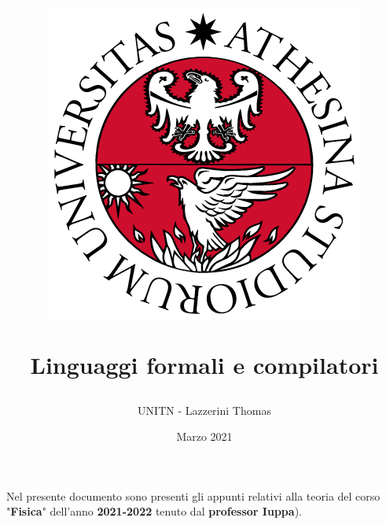 \documentclass[12pt]{article}
\title{
    \begin{figure}[ht!]
        \centering
        \includegraphics[width=.5\textwidth]{LOGO}
        \label{fig:logo unitn}
    \end{figure}
    \bigskip
    Linguaggi formali e compilatori
}
\author{UNITN - Lazzerini Thomas}
\date{Marzo 2021}
\begin{document}
    \maketitle
    \vfill

    \begin{center}
        Nel presente documento sono presenti gli appunti relativi alla teoria del corso "\textbf{Fisica}" dell'anno \textbf{2021-2022} tenuto dal \textbf{professor Iuppa}).\\
    \end{center}
    
    \newpage
    
    \tableofcontents
    
    \newpage
	
	
	
	
\end{document}
